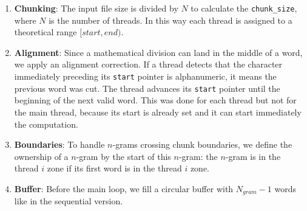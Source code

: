 \begin{enumerate}
    \item \textbf{Chunking}: The input file size is divided by $N$ to calculate the \texttt{chunk\_size}, where $N$ is the number of threads. In this way each thread is assigned to a theoretical range $[start, end)$.
    \item \textbf{Alignment}: Since a mathematical division can land in the middle of a word, we apply an alignment correction. If a thread detects that the character immediately preceding its \texttt{start} pointer is alphanumeric, it means the previous word was cut. The thread advances its \texttt{start} pointer until the beginning of the next valid word. This was done for each thread but not for the main thread, because its start is already set and it can start immediately the computation.
    \item \textbf{Boundaries}: To handle $n$-grams crossing chunk boundaries, we define the ownership of a $n$-gram by the start of this $n$-gram: the $n$-gram is in the thread $i$ zone if its first word is in the thread $i$ zone.
    \item \textbf{Buffer}: Before the main loop, we fill a circular buffer with $N_{gram}-1$ words like in the sequential version.
\end{enumerate}

